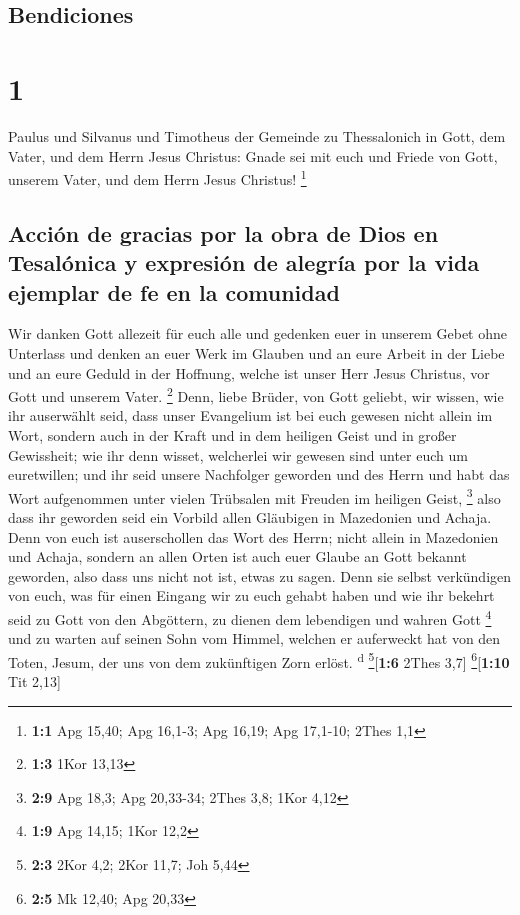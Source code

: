 \hypertarget{bendiciones}{%
\subsection{Bendiciones}\label{bendiciones}}

\hypertarget{section}{%
\section{1}\label{section}}

 Paulus und Silvanus und Timotheus der Gemeinde zu
Thessalonich in Gott, dem Vater, und dem Herrn Jesus Christus: Gnade sei
mit euch und Friede von Gott, unserem Vater, und dem Herrn Jesus
Christus! \footnote{\textbf{1:1} Apg 15,40; Apg 16,1-3; Apg 16,19; Apg
  17,1-10; 2Thes 1,1}

\hypertarget{acciuxf3n-de-gracias-por-la-obra-de-dios-en-tesaluxf3nica-y-expresiuxf3n-de-alegruxeda-por-la-vida-ejemplar-de-fe-en-la-comunidad}{%
\subsection{Acción de gracias por la obra de Dios en Tesalónica y
expresión de alegría por la vida ejemplar de fe en la
comunidad}\label{acciuxf3n-de-gracias-por-la-obra-de-dios-en-tesaluxf3nica-y-expresiuxf3n-de-alegruxeda-por-la-vida-ejemplar-de-fe-en-la-comunidad}}

 Wir danken Gott allezeit für euch alle und gedenken euer
in unserem Gebet ohne Unterlass  und denken an euer Werk
im Glauben und an eure Arbeit in der Liebe und an eure Geduld in der
Hoffnung, welche ist unser Herr Jesus Christus, vor Gott und unserem
Vater. \footnote{\textbf{1:3} 1Kor 13,13}  Denn, liebe
Brüder, von Gott geliebt, wir wissen, wie ihr auserwählt seid,
 dass unser Evangelium ist bei euch gewesen nicht allein
im Wort, sondern auch in der Kraft und in dem heiligen Geist und in
großer Gewissheit; wie ihr denn wisset, welcherlei wir gewesen sind
unter euch um euretwillen;  und ihr seid unsere Nachfolger
geworden und des Herrn und habt das Wort aufgenommen unter vielen
Trübsalen mit Freuden im heiligen Geist, \footnote{\textbf{2:9} Apg
  18,3; Apg 20,33-34; 2Thes 3,8; 1Kor 4,12}  also dass ihr
geworden seid ein Vorbild allen Gläubigen in Mazedonien und Achaja.
 Denn von euch ist auserschollen das Wort des Herrn; nicht
allein in Mazedonien und Achaja, sondern an allen Orten ist auch euer
Glaube an Gott bekannt geworden, also dass uns nicht not ist, etwas zu
sagen.  Denn sie selbst verkündigen von euch, was für
einen Eingang wir zu euch gehabt haben und wie ihr bekehrt seid zu Gott
von den Abgöttern, zu dienen dem lebendigen und wahren Gott \footnote{\textbf{1:9}
  Apg 14,15; 1Kor 12,2}  und zu warten auf seinen Sohn
vom Himmel, welchen er auferweckt hat von den Toten, Jesum, der uns von
dem zukünftigen Zorn erlöst. \textsuperscript{d}
\footnote{\textbf{2:3} 2Kor 4,2; 2Kor 11,7; Joh 5,44}{[}\textbf{1:6}
2Thes 3,7{]} \footnote{\textbf{2:5} Mk 12,40; Apg 20,33}{[}\textbf{1:10}
Tit 2,13{]}

